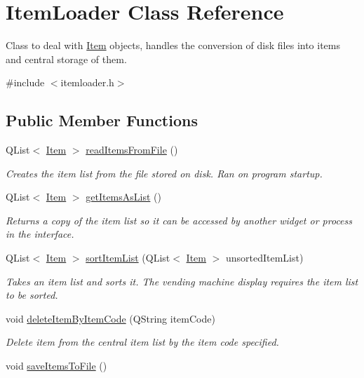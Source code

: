 \hypertarget{class_item_loader}{\section{Item\-Loader Class Reference}
\label{class_item_loader}
}


Class to deal with \hyperlink{struct_item}{Item} objects, handles the conversion of disk files into items and central storage of them.  




{\ttfamily \#include $<$itemloader.\-h$>$}

\subsection*{Public Member Functions}
\begin{DoxyCompactItemize}
\item 
Q\-List$<$ \hyperlink{struct_item}{Item} $>$ \hyperlink{class_item_loader_af93748db68ddb6bb109e5893d93cbac5}{read\-Items\-From\-File} ()
\begin{DoxyCompactList}\small\item\em Creates the item list from the file stored on disk. Ran on program startup. \end{DoxyCompactList}\item 
Q\-List$<$ \hyperlink{struct_item}{Item} $>$ \hyperlink{class_item_loader_a46e4c47f55b09406d842dd0e3dd08461}{get\-Items\-As\-List} ()
\begin{DoxyCompactList}\small\item\em Returns a copy of the item list so it can be accessed by another widget or process in the interface. \end{DoxyCompactList}\item 
Q\-List$<$ \hyperlink{struct_item}{Item} $>$ \hyperlink{class_item_loader_ac1fdb6c2191e24cd3dda887272e916ea}{sort\-Item\-List} (Q\-List$<$ \hyperlink{struct_item}{Item} $>$ unsorted\-Item\-List)
\begin{DoxyCompactList}\small\item\em Takes an item list and sorts it. The vending machine display requires the item list to be sorted. \end{DoxyCompactList}\item 
void \hyperlink{class_item_loader_ae593d5eda6e517768f19fce0dd9dcb91}{delete\-Item\-By\-Item\-Code} (Q\-String item\-Code)
\begin{DoxyCompactList}\small\item\em Delete item from the central item list by the item code specified. \end{DoxyCompactList}\item 
\hypertarget{class_item_loader_ab0d5a686e19d53486d74b82146f71976}{void \hyperlink{class_item_loader_ab0d5a686e19d53486d74b82146f71976}{save\-Items\-To\-File} ()}\label{class_item_loader_ab0d5a686e19d53486d74b82146f71976}


\end{DoxyCompactItemize}
